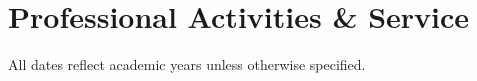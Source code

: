 \documentclass[10pt,letterpaper,final]{moderncv}
\begin{document}

\section{\textbf{Professional Activities \& Service}}
{All dates reflect academic years unless otherwise specified. } 
\end{document}
